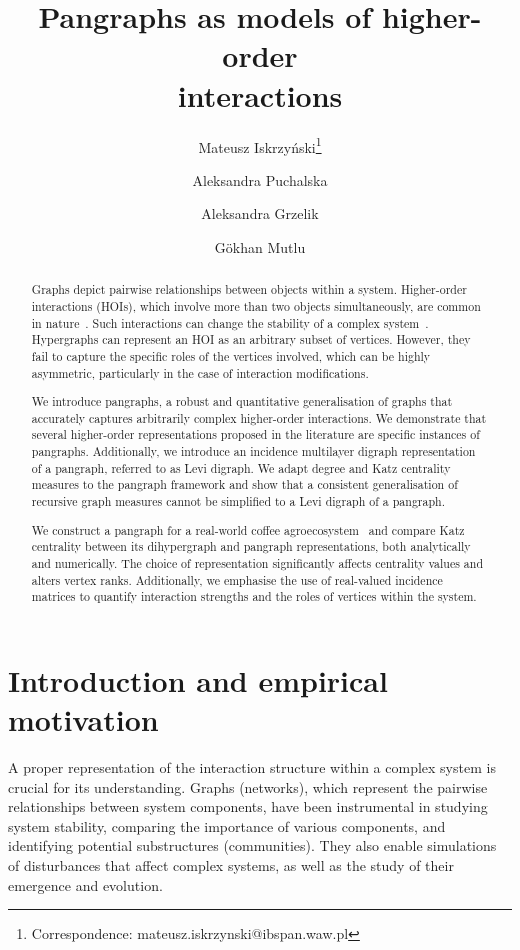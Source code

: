 \documentclass[a4paper,12pt]{article}
\title{Pangraphs as models of higher-order \\
interactions}
\author[1]{Mateusz Iskrzyński\thanks{Correspondence: mateusz.iskrzynski@ibspan.waw.pl}}
\author[2]{Aleksandra Puchalska}
\author[1]{Aleksandra Grzelik}
\author[3]{G\"okhan Mutlu}
\affil[1]{\normalsize Systems Research Institute, Polish Academy of Sciences, Warsaw, Poland}
\affil[2]{\normalsize Institute of Applied Mathematics and Mechanics, University of Warsaw, Warsaw, Poland}
\affil[3]{\normalsize Department of Mathematics, Gazi University, Ankara, Turkey}
\theoremstyle{definition}
\theoremstyle{remark}
\begin{document}
\maketitle

\begin{abstract}
Graphs depict pairwise relationships between objects within a system. Higher-order interactions (HOIs), which involve more than two objects simultaneously, are common in nature~\cite{GOLUBSKI2016344, Moleon_scavenging, Levine_2017, Mayfield2017}. Such interactions can change the stability of a complex system~\cite{Grilli2017}. Hypergraphs can represent an HOI as an arbitrary subset of vertices. However, they fail to capture the specific roles of the vertices involved, which can be highly asymmetric, particularly in the case of interaction modifications.

We introduce pangraphs, a robust and quantitative generalisation of graphs that accurately captures arbitrarily complex higher-order interactions. We demonstrate that several higher-order representations proposed in the literature are specific instances of pangraphs. Additionally, we introduce an incidence multilayer digraph representation of a pangraph, referred to as Levi digraph. We adapt degree and Katz centrality measures to the pangraph framework and show that a consistent generalisation of recursive graph measures cannot be simplified to a Levi digraph of a pangraph.

We construct a pangraph for a real-world coffee agroecosystem~\cite{GOLUBSKI2016344} and compare Katz centrality between its dihypergraph and pangraph representations, both analytically and numerically. The choice of representation significantly affects centrality values and alters vertex ranks. Additionally, we emphasise the use of real-valued incidence matrices to quantify interaction strengths and the roles of vertices within the system.

\end{abstract}

  

\tableofcontents


\section{Introduction and empirical motivation}

    
    A proper representation of the interaction structure within a complex system is crucial for its understanding. Graphs (networks), which represent the pairwise relationships between system components, have been instrumental in studying system stability, comparing the importance of various components, and identifying potential substructures (communities). They also enable simulations of disturbances that affect complex systems, as well as the study of their emergence and evolution. 
    
\end{document}
